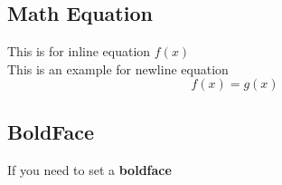 \documentclass[12pt]{article}
\newcommand{\bb}[1]{{\textbf {#1}}}
\newcommand{\e}[1]{$ #1 $}
\newcommand{\ee}[1]{$$ #1 $$}
\begin{document}
        \subsection{Math Equation}
            This is for inline equation \e{f(x)}\\

            This is an example for newline equation \ee{
                f(x) = g(x)
                }

        \subsection{BoldFace}
            If you need to set a \bb{boldface}
\end{document}
